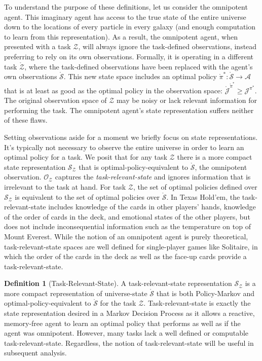\documentclass{article} %
\theoremstyle{definition}
\newtheorem{definition}{Definition}[section]
\begin{document}
To understand the purpose of these definitions, let us consider the
omnipotent agent. This imaginary agent has access to the true state of
the entire universe down to the locations of every particle in every
galaxy (and enough computation to learn from this representation). As
a result, the omnipotent agent, when presented with a task
$\mathcal{Z}$, will always ignore the task-defined observations,
instead preferring to rely on its own observations. Formally, it is
operating in a different task $\mathring{\mathcal{Z}}$, where the
task-defined observations have been replaced with the agent's own
observations $\mathring{\mathcal{S}}$. This new state space includes
an optimal policy $\mathring{\pi}^*: \mathring{\mathcal{S}}
\rightarrow \mathcal{A}$ that is at least as good as the optimal
policy in the observation space:
$\mathring{\mathcal{J}}^{\mathring{\pi}^*} \ge
\mathcal{J}^{\pi^*}$. The original observation space of $\mathcal{Z}$
may be noisy or lack relevant information for performing the task. The
omnipotent agent's state representation suffers neither of these
flaws.

Setting observations aside for a moment we briefly focus on state
representations. It's typically not necessary to observe the entire
universe in order to learn an optimal policy for a task. We posit that
for any task $\mathcal{Z}$ there is a more compact state
representation $\mathcal{S}_\mathcal{Z}$ that is optimal-policy-equivalent
to $\mathring{\mathcal{S}}$, the omnipotent
observation. $\mathcal{O}_\mathcal{Z}$ captures the
\textit{task-relevant-state} and ignores information that is
irrelevant to the task at hand. For task $\mathcal{Z}$, the set of
optimal policies defined over $\mathcal{S}_\mathcal{Z}$ is equivalent
to the set of optimal policies over $\mathring{\mathcal{S}}$. In Texas
Hold'em, the task-relevant-state includes knowledge of the cards in
other players' hands, knowledge of the order of cards in the deck, and
emotional states of the other players, but does not include
inconsequential information such as the temperature on top of Mount
Everest. While the notion of an omnipotent agent is purely
theoretical, task-relevant-state spaces are well defined for
single-player games like Solitaire, in which the order of the cards in
the deck as well as the face-up cards provide a task-relevant-state.

\begin{definition}[Task-Relevant-State]
\label{def:taskRelState}
A task-relevant-state representation $\mathcal{S}_\mathcal{Z}$ is a
more compact representation of universe-state $\mathring{\mathcal{S}}$
that is both Policy-Markov and optimal-policy-equivalent to
$\mathring{\mathcal{S}}$ for the task
$\mathcal{Z}$. Task-relevant-state is exactly the state representation
desired in a Markov Decision Process as it allows a reactive,
memory-free agent to learn an optimal policy that performs as well as
if the agent was omnipotent. However, many tasks lack a well defined
or computable task-relevant-state. Regardless, the notion of
task-relevant-state will be useful in subsequent analysis.
\end{definition}
\end{document}
